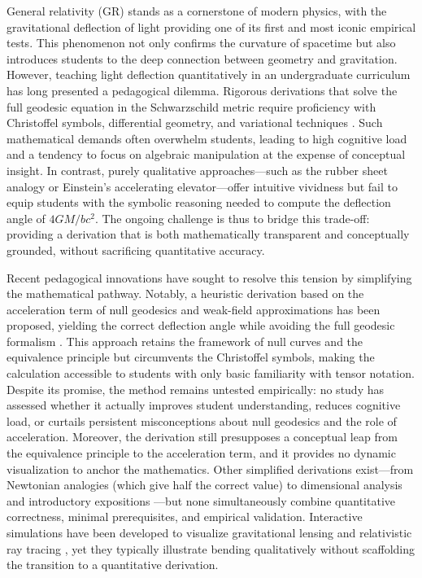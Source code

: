 \documentclass{article}
\begin{document}
General relativity (GR) stands as a cornerstone of modern physics, with the gravitational deflection of light providing one of its first and most iconic empirical tests. This phenomenon not only confirms the curvature of spacetime but also introduces students to the deep connection between geometry and gravitation. However, teaching light deflection quantitatively in an undergraduate curriculum has long presented a pedagogical dilemma. Rigorous derivations that solve the full geodesic equation in the Schwarzschild metric require proficiency with Christoffel symbols, differential geometry, and variational techniques \cite{hartle2003gravity,schutz2009first}. Such mathematical demands often overwhelm students, leading to high cognitive load and a tendency to focus on algebraic manipulation at the expense of conceptual insight. In contrast, purely qualitative approaches—such as the rubber sheet analogy or Einstein’s accelerating elevator—offer intuitive vividness but fail to equip students with the symbolic reasoning needed to compute the deflection angle of \(4GM/bc^2\). The ongoing challenge is thus to bridge this trade-off: providing a derivation that is both mathematically transparent and conceptually grounded, without sacrificing quantitative accuracy.

Recent pedagogical innovations have sought to resolve this tension by simplifying the mathematical pathway. Notably, a heuristic derivation based on the acceleration term of null geodesics and weak-field approximations has been proposed, yielding the correct deflection angle while avoiding the full geodesic formalism \cite{davis2021heuristic}. This approach retains the framework of null curves and the equivalence principle but circumvents the Christoffel symbols, making the calculation accessible to students with only basic familiarity with tensor notation. Despite its promise, the method remains untested empirically: no study has assessed whether it actually improves student understanding, reduces cognitive load, or curtails persistent misconceptions about null geodesics and the role of acceleration. Moreover, the derivation still presupposes a conceptual leap from the equivalence principle to the acceleration term, and it provides no dynamic visualization to anchor the mathematics. Other simplified derivations exist—from Newtonian analogies (which give half the correct value) to dimensional analysis and introductory expositions \cite{carroll2004spacetime}—but none simultaneously combine quantitative correctness, minimal prerequisites, and empirical validation. Interactive simulations have been developed to visualize gravitational lensing and relativistic ray tracing \cite{weiskopf2006vis,price2007gravwaves}, yet they typically illustrate bending qualitatively without scaffolding the transition to a quantitative derivation.
\end{document}
